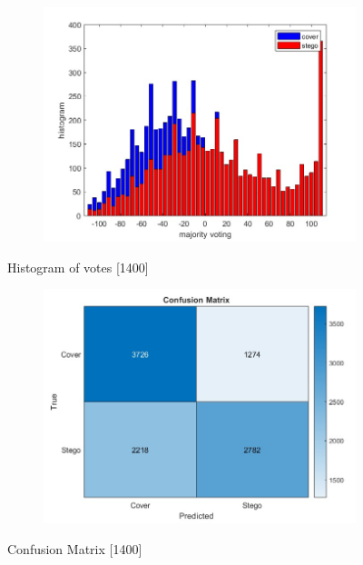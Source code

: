 \begin{figure}[H]
    \centering
    \begin{subfigure}[b]{0.5\textwidth}
        \includegraphics[width=\textwidth]{img/1400/gray1400histo.jpg}
    \end{subfigure}
    \caption{Histogram of votes [1400]}
\begin{table}[H]
    \centering
        \begin{subfigure}[b]{0.5\textwidth}
            \includegraphics[width=\textwidth]{img/1400/gray1400confuse.jpg}
        \end{subfigure}
    \caption{Confusion Matrix [1400]}
\end{table}
\end{figure}
